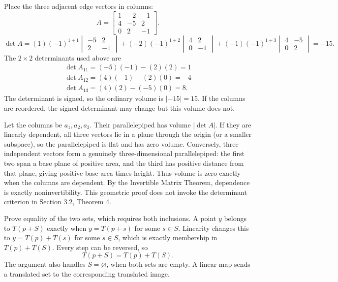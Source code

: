 Place the three adjacent edge vectors in columns:
\[A=\begin{bmatrix}1&-2&-1\\4&-5&2\\0&2&-1\end{bmatrix}.\]
\[
\det A=(1)(-1)^{1+1}\begin{vmatrix}-5&2\\2&-1\end{vmatrix} + (-2)(-1)^{1+2}\begin{vmatrix}4&2\\0&-1\end{vmatrix} + (-1)(-1)^{1+3}\begin{vmatrix}4&-5\\0&2\end{vmatrix}=-15.
\]
The $2\times2$ determinants used above are
\[
\begin{gathered}\det A_{11}=(-5)(-1)-(2)(2)=1\\\det A_{12}=(4)(-1)-(2)(0)=-4\\\det A_{13}=(4)(2)-(-5)(0)=8.\end{gathered}
\]
The determinant is signed, so the ordinary volume is $|-15|=15$. If the columns are reordered, the signed determinant may change but this volume does not.


Let the columns be $a_1,a_2,a_3$. Their parallelepiped has volume $|\det A|$. If they are linearly dependent, all three vectors lie in a plane through the origin (or a smaller subspace), so the parallelepiped is flat and has zero volume. Conversely, three independent vectors form a genuinely three-dimensional parallelepiped: the first two span a base plane of positive area, and the third has positive distance from that plane, giving positive base-area times height. Thus volume is zero exactly when the columns are dependent. By the Invertible Matrix Theorem, dependence is exactly noninvertibility. This geometric proof does not invoke the determinant criterion in Section 3.2, Theorem 4.

\goal Prove equality of the two sets, which requires both inclusions.
A point $y$ belongs to $T(p+S)$ exactly when $y=T(p+s)$ for some $s\in S$. Linearity changes this to $y=T(p)+T(s)$ for some $s\in S$, which is exactly membership in $T(p)+T(S)$. Every step can be reversed, so
\[
T(p+S)=T(p)+T(S).
\]
The argument also handles $S=\varnothing$, when both sets are empty. A linear map sends a translated set to the corresponding translated image.

